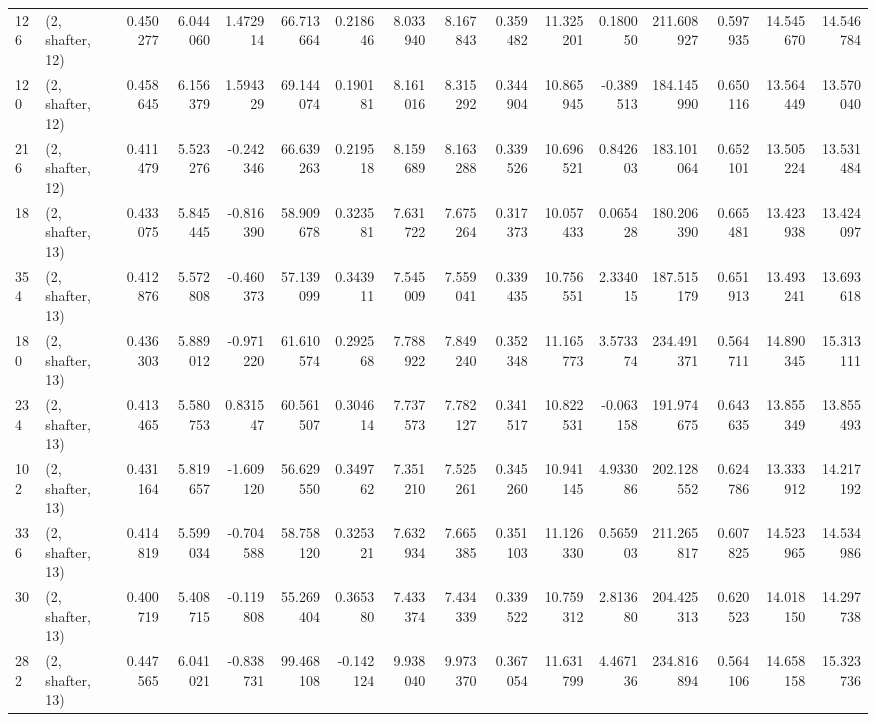 \begin{tabular}{llrrrrrrrrrrrrrr}
126 &  (2, shafter, 12) &   0.450277 &   6.044060 &   1.472914 &    66.713664 &   0.218646 &   8.033940 &   8.167843 &  0.359482 &  11.325201 &   0.180050 &   211.608927 &  0.597935 &  14.545670 &  14.546784 \\
120 &  (2, shafter, 12) &   0.458645 &   6.156379 &   1.594329 &    69.144074 &   0.190181 &   8.161016 &   8.315292 &  0.344904 &  10.865945 &  -0.389513 &   184.145990 &  0.650116 &  13.564449 &  13.570040 \\
216 &  (2, shafter, 12) &   0.411479 &   5.523276 &  -0.242346 &    66.639263 &   0.219518 &   8.159689 &   8.163288 &  0.339526 &  10.696521 &   0.842603 &   183.101064 &  0.652101 &  13.505224 &  13.531484 \\
18  &  (2, shafter, 13) &   0.433075 &   5.845445 &  -0.816390 &    58.909678 &   0.323581 &   7.631722 &   7.675264 &  0.317373 &  10.057433 &   0.065428 &   180.206390 &  0.665481 &  13.423938 &  13.424097 \\
354 &  (2, shafter, 13) &   0.412876 &   5.572808 &  -0.460373 &    57.139099 &   0.343911 &   7.545009 &   7.559041 &  0.339435 &  10.756551 &   2.334015 &   187.515179 &  0.651913 &  13.493241 &  13.693618 \\
180 &  (2, shafter, 13) &   0.436303 &   5.889012 &  -0.971220 &    61.610574 &   0.292568 &   7.788922 &   7.849240 &  0.352348 &  11.165773 &   3.573374 &   234.491371 &  0.564711 &  14.890345 &  15.313111 \\
234 &  (2, shafter, 13) &   0.413465 &   5.580753 &   0.831547 &    60.561507 &   0.304614 &   7.737573 &   7.782127 &  0.341517 &  10.822531 &  -0.063158 &   191.974675 &  0.643635 &  13.855349 &  13.855493 \\
102 &  (2, shafter, 13) &   0.431164 &   5.819657 &  -1.609120 &    56.629550 &   0.349762 &   7.351210 &   7.525261 &  0.345260 &  10.941145 &   4.933086 &   202.128552 &  0.624786 &  13.333912 &  14.217192 \\
336 &  (2, shafter, 13) &   0.414819 &   5.599034 &  -0.704588 &    58.758120 &   0.325321 &   7.632934 &   7.665385 &  0.351103 &  11.126330 &   0.565903 &   211.265817 &  0.607825 &  14.523965 &  14.534986 \\
30  &  (2, shafter, 13) &   0.400719 &   5.408715 &  -0.119808 &    55.269404 &   0.365380 &   7.433374 &   7.434339 &  0.339522 &  10.759312 &   2.813680 &   204.425313 &  0.620523 &  14.018150 &  14.297738 \\
282 &  (2, shafter, 13) &   0.447565 &   6.041021 &  -0.838731 &    99.468108 &  -0.142124 &   9.938040 &   9.973370 &  0.367054 &  11.631799 &   4.467136 &   234.816894 &  0.564106 &  14.658158 &  15.323736 \\

\end{tabular}
